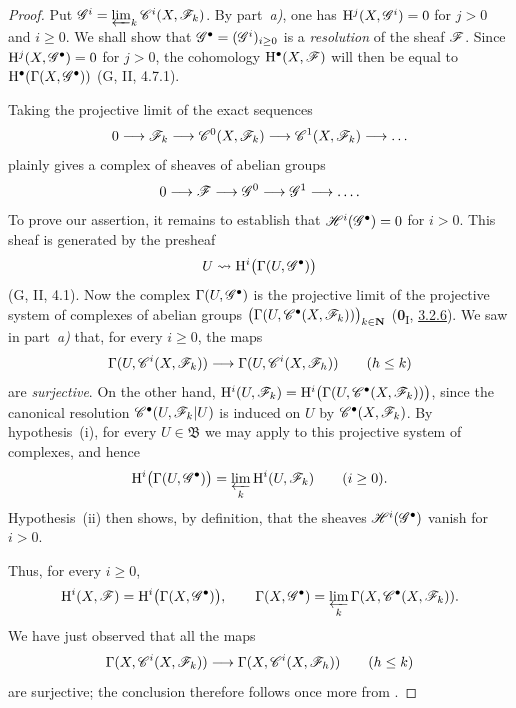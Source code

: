 \begin{proof}
Put $\mathscr{G}^i=\varprojlim_k\mathscr{C}^i(X,\mathscr{F}_k)$.
By part~\emph{a)}, one has
$\mathrm{H}^j(X,\mathscr{G}^i)=0$ for $j>0$ and $i\geq0$.
We shall show that
$\mathscr{G}^\bullet=(\mathscr{G}^i)_{i\geq0}$ is a \emph{resolution} of the sheaf
$\mathscr{F}$. Since $\mathrm{H}^j(X,\mathscr{G}^\bullet)=0$ for $j>0$, the cohomology
$\mathrm{H}^\bullet(X,\mathscr{F})$ will then be equal to
$\mathrm{H}^\bullet(\Gamma(X,\mathscr{G}^\bullet))$ (G, II, 4.7.1).

Taking the projective limit of the exact sequences
\[
  0\longrightarrow\mathscr{F}_k
  \longrightarrow\mathscr{C}^0(X,\mathscr{F}_k)
  \longrightarrow\mathscr{C}^1(X,\mathscr{F}_k)
  \longrightarrow\ldots
\]
plainly gives a complex of sheaves of abelian groups
\[
  0\longrightarrow\mathscr{F}
  \longrightarrow\mathscr{G}^0
  \longrightarrow\mathscr{G}^1
  \longrightarrow\ldots.
\]
To prove our assertion, it remains to establish that
$\mathscr{H}^i(\mathscr{G}^\bullet)=0$ for $i>0$.
This sheaf is generated by the presheaf
\[
  U\leadsto\mathrm{H}^i\bigl(\Gamma(U,\mathscr{G}^\bullet)\bigr)
\]
(G, II, 4.1).
Now the complex $\Gamma(U,\mathscr{G}^\bullet)$ is the projective limit of
the projective system of complexes of abelian groups $\bigl(\Gamma(U,\mathscr{C}^\bullet(X,\mathscr{F}_k))\bigr)_{k\in\mathbf{N}}$
(\textbf{0}\textsubscript{I}, \hyperref[0.3.2.6]{3.2.6}).
We saw in part~\emph{a)} that, for every $i\geq0$, the maps
\[
  \Gamma(U,\mathscr{C}^i(X,\mathscr{F}_k))
  \longrightarrow
  \Gamma(U,\mathscr{C}^i(X,\mathscr{F}_h))
  \qquad(h\leq k)
\]
are \emph{surjective}. On the other hand, $\mathrm{H}^i(U,\mathscr{F}_k)
=
\mathrm{H}^i\bigl(\Gamma(U,\mathscr{C}^\bullet(X,\mathscr{F}_k))\bigr)$,
since the canonical resolution $\mathscr{C}^\bullet(U,\mathscr{F}_k|U)$ is
induced on $U$ by $\mathscr{C}^\bullet(X,\mathscr{F}_k)$.
By hypothesis~{\rm(i)}, for every $U\in\mathfrak{B}$ we may apply
 to this projective system of complexes, and hence
\[
  \mathrm{H}^i\bigl(\Gamma(U,\mathscr{G}^\bullet)\bigr)
  =
  \varprojlim_k\mathrm{H}^i(U,\mathscr{F}_k)
  \qquad(i\geq0).
\]
Hypothesis~{\rm(ii)} then shows, by definition, that the sheaves
$\mathscr{H}^i(\mathscr{G}^\bullet)$ vanish for $i>0$.

Thus, for every $i\geq0$,
\[
  \mathrm{H}^i(X,\mathscr{F})
  =
  \mathrm{H}^i\bigl(\Gamma(X,\mathscr{G}^\bullet)\bigr),
  \qquad
  \Gamma(X,\mathscr{G}^\bullet)
  =
  \varprojlim_k\Gamma(X,\mathscr{C}^\bullet(X,\mathscr{F}_k)).
\]
We have just observed that all the maps
\[
  \Gamma(X,\mathscr{C}^i(X,\mathscr{F}_k))
  \longrightarrow
  \Gamma(X,\mathscr{C}^i(X,\mathscr{F}_h))
  \qquad(h\leq k)
\]
are surjective; the conclusion therefore follows once more from
.
\end{proof}

